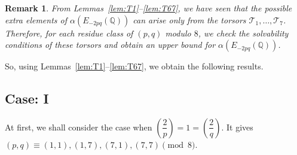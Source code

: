 \documentclass[12pt]{amsart}
\newcommand{\bbQ}{\mathbb{Q}}
\newcommand{\cT}{\mathcal{T}}
\numberwithin{equation}{section}
\newtheorem{rem}{Remark}[section]
\newtheorem{lem}{Lemma}[section]
\theoremstyle{definition}
\begin{document}







\smallskip

\begin{rem}
\label{rem:alpha_case}
From Lemmas~\ref{lem:T1}--\ref{lem:T67}, we have seen that the possible extra
elements of $\alpha\left(E_{-2pq}(\bbQ)\right)$ can arise only from the torsors
$\cT_{1},\ldots,\cT_{7}$. Therefore, for each residue class of $(p,q)$ modulo $8$,
we check the solvability conditions of these torsors and obtain an upper bound for
$\alpha\left(E_{-2pq}(\bbQ)\right)$.
\end{rem}

So, using Lemmas~\ref{lem:T1}--\ref{lem:T67}, we obtain the following results.


\medskip





\subsection*{Case: I}

At first, we shall consider the case when $\left(\dfrac{2}{p}\right)=1=\left(\dfrac{2}{q}\right)$.
It gives $(p,q)\equiv (1,1),(1,7),(7,1),(7,7)\pmod 8$.
\end{document}
